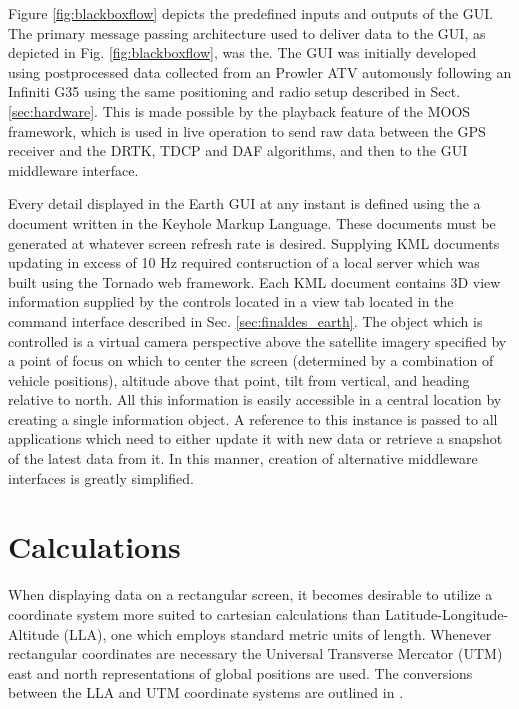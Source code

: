 Figure \ref{fig:blackboxflow} depicts the predefined inputs and outputs of the GUI. The primary message passing architecture used to deliver data to the GUI, as depicted in Fig. \ref{fig:blackboxflow}, was the. The GUI was initially developed using postprocessed data collected from an Prowler ATV automously following an Infiniti G35 using the same positioning and radio setup described in Sect. \ref{sec:hardware}. This is made possible by the playback feature of the MOOS framework, which is used in live operation to send raw data between the GPS receiver and the DRTK, TDCP and DAF algorithms, and then to the GUI middleware interface.

Every detail displayed in the Earth GUI at any instant is defined using the a document written in the Keyhole Markup Language. These documents must be generated at whatever screen refresh rate is desired. Supplying KML documents updating in excess of 10 Hz required contsruction of a local server which was built using the Tornado web framework. Each KML document contains 3D view information supplied by the controls located in a view tab located in the command interface described in Sec. \ref{sec:finaldes_earth}. The object which is controlled is a virtual camera perspective above the satellite imagery specified by a point of focus on which to center the screen (determined by a combination of vehicle positions), altitude above that point, tilt from vertical, and heading relative to north.
All this information is easily accessible in a central location by creating a single information object. A reference to this instance is passed to all applications which need to either update it with new data or retrieve a snapshot of the latest data from it. In this manner, creation of alternative middleware interfaces is greatly simplified.

\section{Calculations} \label{sec:guicalc}

When displaying data on a rectangular screen, it becomes desirable to utilize a coordinate system more suited to cartesian calculations than Latitude-Longitude-Altitude (LLA), one which employs standard metric units of length. Whenever rectangular coordinates are necessary the Universal Transverse Mercator (UTM) east and north representations of global positions are used. The conversions between the LLA and UTM coordinate systems are outlined in \cite{projections}.

